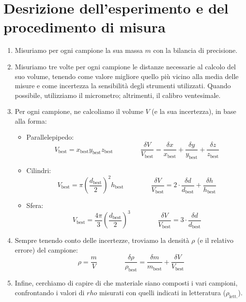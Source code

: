 \documentclass{article}
\begin{document}
\section{Desrizione dell'esperimento e del procedimento di misura}
\begin{enumerate}
    \item Misuriamo per ogni campione la sua massa $m$ con la bilancia di precisione.
    \item Misuriamo tre volte per ogni campione le distanze necessarie al calcolo
          del suo volume, tenendo come valore migliore quello più vicino alla media
          delle misure e come incertezza la sensibilità degli strumenti utilizzati.
          Quando possibile, utilizziamo il micrometro; altrimenti, il calibro ventesimale.
    \item Per ogni campione, ne calcoliamo il volume $V$ (e la sua incertezza), in base alla forma:
    \begin{itemize}
        \item Parallelepipedo:
            \[
                V_\text{best} = x_\text{best} y_\text{best} z_\text{best}
                \qquad\qquad
                \frac{\delta V}{V_\text{best}} = \frac{\delta x}{x_\text{best}} + \frac{\delta y}{y_\text{best}} + \frac{\delta z}{z_\text{best}}
            \]
        \item Cilindri:
            \[
                V_\text{best} = \pi \left(\frac{d_\text{best}}{2}\right)^2 h_\text{best}
                \qquad\qquad
                \frac{\delta V}{V_\text{best}} = 2 \cdot \frac{\delta d}{d_\text{best}} + \frac{\delta h}{h_\text{best}}
            \]
        \item Sfera:
            \[
                V_\text{best} = \frac{4 \pi}{3} \left(\frac{d_\text{best}}{2}\right)^3
                \qquad\qquad
                \frac{\delta V}{V_\text{best}} = 3 \cdot \frac{\delta d}{d_\text{best}}
            \]
    \end{itemize}
    \item Sempre tenendo conto delle incertezze, troviamo la densità $\rho$ (e il relativo errore) del campione:
        \[
            \rho = \frac{m}{V}
            \qquad\qquad
            \frac{\delta \rho}{\rho_\text{best}} = \frac{\delta m}{m_\text{best}} + \frac{\delta V}{V_\text{best}}
        \]
    \item Infine, cerchiamo di capire di che materiale siano composti i vari campioni, confrontando
    i valori di $rho$ misurati con quelli indicati in letteratura ($\rho_\text{lett.}$).
\end{enumerate}
\end{document}
